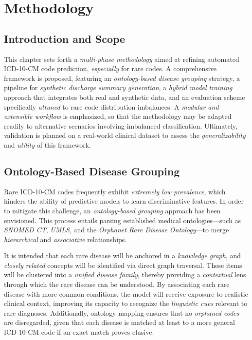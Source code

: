 \chapter{Methodology}
\label{chap:methodology}

\section{Introduction and Scope}
This chapter sets forth a \emph{multi-phase methodology} aimed at refining automated ICD-10-CM code prediction, \emph{especially} for rare codes. A comprehensive framework is proposed, featuring an \emph{ontology-based disease grouping} strategy, a pipeline for \emph{synthetic discharge summary generation}, a \emph{hybrid model training} approach that integrates both real and synthetic data, and an evaluation scheme specifically \emph{attuned} to rare code distribution imbalances. A \emph{modular and extensible workflow} is emphasized, so that the methodology may be adapted readily to alternative scenarios involving imbalanced classification. Ultimately, validation is planned on a real-world clinical dataset to assess the \emph{generalizability} and \emph{utility} of this framework.

\section{Ontology-Based Disease Grouping}
Rare ICD-10-CM codes frequently exhibit \emph{extremely low prevalence}, which hinders the ability of predictive models to learn discriminative features. In order to mitigate this challenge, an \emph{ontology-based grouping} approach has been envisioned. This process entails parsing established medical ontologies---such as \emph{SNOMED CT}, \emph{UMLS}, and the \emph{Orphanet Rare Disease Ontology}---to merge \emph{hierarchical} and \emph{associative} relationships.

It is intended that each rare disease will be anchored in a \emph{knowledge graph}, and \emph{closely related} concepts will be identified via direct graph traversal. These items will be clustered into a \emph{unified disease family}, thereby providing a \emph{contextual} lens through which the rare disease can be understood. By associating each rare disease with more common conditions, the model will receive exposure to realistic clinical context, improving its capacity to recognize the \emph{linguistic cues} relevant to rare diagnoses. Additionally, ontology mapping ensures that no \emph{orphaned codes} are disregarded, given that each disease is matched at least to a more general ICD-10-CM code if an exact match proves elusive.

